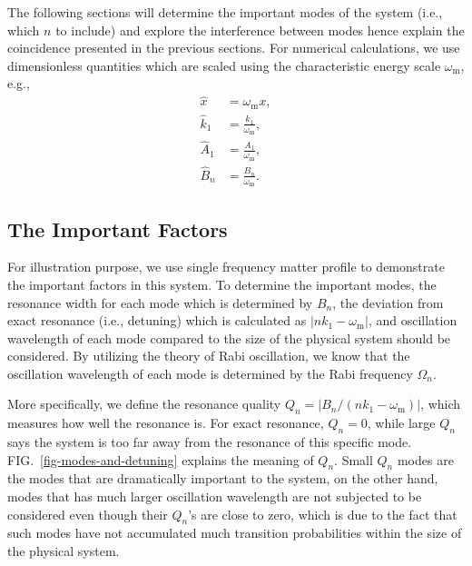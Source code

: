 \documentclass[%
reprint,
 amsmath,amssymb,
 aps,
]{revtex4-1}
\begin{document}
The following sections will determine the important modes of the system (i.e., which $n$ to include) and explore the interference between modes hence explain the coincidence presented in the previous sections. For numerical calculations, we use dimensionless quantities which are scaled using the characteristic energy scale $\omega_{\mathrm{m}}$, e.g.,
\begin{align*}
    \hat x &= \omega_{\mathrm{m}}x, \\
    \hat k_1 & = \frac{k_1}{\omega_{\mathrm{m}}}, \\
    \hat A_1 & = \frac{A_1}{\omega_{\mathrm{m}}}, \\
    \hat B_n &= \frac{B_n}{\omega_{\mathrm{m}}}.
\end{align*}

    

\subsection{The Important Factors}




For illustration purpose, we use single frequency matter profile to demonstrate the important factors in this system. To determine the important modes, the resonance width for each mode which is determined by $B_n$, the deviation from exact resonance (i.e., detuning) which is calculated as $\lvert n k_1 - \omega_{\mathrm{m}} \rvert$, and oscillation wavelength of each mode compared to the size of the physical system should be considered. By utilizing the theory of Rabi oscillation, we know that the oscillation wavelength of each mode is determined by the Rabi frequency $\Omega_n$.

More specifically, we define the resonance quality $Q_n = \lvert B_n/( n k_1 - \omega_{\mathrm{m}}  )\rvert$, which measures how well the resonance is. For exact resonance, $Q_n=0$, while large $Q_n$ says the system is too far away from the resonance of this specific mode. FIG.~\ref{fig-modes-and-detuning} explains the meaning of $Q_n$. Small $Q_n$ modes are the modes that are dramatically important to the system, on the other hand, modes that has much larger oscillation wavelength are not subjected to be considered even though their $Q_n$'s are close to zero, which is due to the fact that such modes have not accumulated much transition probabilities within the size of the physical system.
\end{document}
